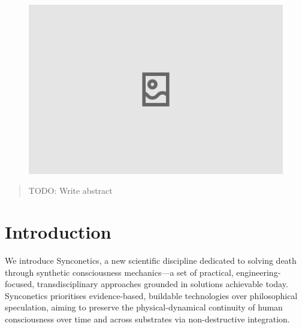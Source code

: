 \documentclass[10pt]{article}
\begin{document}
\begin{sloppypar}

  \begin{figure}[ht]
    \centering
    \includegraphics[width=\textwidth]{figures/cover.png}
    \label{fig:cover}
  \end{figure}
  \newpage


  \begin{abstract}
    TODO: Write abstract
  \end{abstract}

  \pagebreak
  \tableofcontents
  \pagebreak


  \section{Introduction}
  \label{sec:introduction}

  We introduce Synconetics, a new scientific discipline dedicated to solving death through synthetic consciousness mechanics—a set of practical, engineering-focused, transdisciplinary approaches grounded in solutions achievable today. Synconetics prioritises evidence-based, buildable technologies over philosophical speculation, aiming to preserve the physical-dynamical continuity of human consciousness over time and across substrates via non-destructive integration.


\end{sloppypar}
\end{document}
